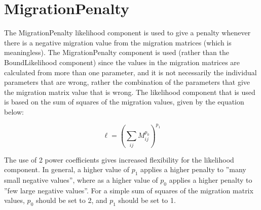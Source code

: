 \documentclass [a4paper, 10pt]{book}
\begin{document}




\section{MigrationPenalty}\label{sec:migpenalty}
The MigrationPenalty likelihood component is used to give a penalty whenever there is a negative migration value from the migration matrices (which is meaningless).  The MigrationPenalty component is used (rather than the BoundLikelihood component) since the values in the migration matrices are calculated from more than one parameter, and it is not necessarily the individual parameters that are wrong, rather the combination of the parameters that give the migration matrix value that is wrong.  The likelihood component that is used is based on the sum of squares of the migration values, given by the equation below:

\begin{equation}\label{eq:migpenalty}
\ell = \left( \sum_{ij}^{} M_{ij}^{p_0} \right)^{p_1}
\end{equation}

\bigskip
The use of 2 power coefficients gives increased flexibility for the likelihood component.  In general, a higher value of $p_1$ applies a higher penalty to ''many small negative values'', where as a higher value of $p_0$ applies a higher penalty to ''few large negative values''.  For a simple sum of squares of the migration matrix values, $p_0$ should be set to 2, and $p_1$ should be set to 1.
\end{document}
